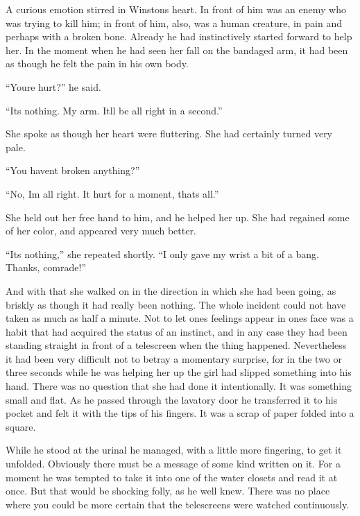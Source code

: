 A curious emotion stirred in Winston\textquotesingle s heart. In front
of him was an enemy who was trying to kill him; in front of him, also,
was a human creature, in pain and perhaps with a broken bone. Already he
had instinctively started forward to help her. In the moment when he had
seen her fall on the bandaged arm, it had been as though he felt the
pain in his own body.

``You\textquotesingle re hurt?'' he said.

``It\textquotesingle s nothing. My arm. It\textquotesingle ll be all
right in a second.''

She spoke as though her heart were fluttering. She had certainly turned
very pale.

``You haven\textquotesingle t broken anything?''

``No, I\textquotesingle m all right. It hurt for a moment,
that\textquotesingle s all.''

She held out her free hand to him, and he helped her up. She had
regained some of her color, and appeared very much better.

``It\textquotesingle s nothing,'' she repeated shortly. ``I only gave my
wrist a bit of a bang. Thanks, comrade!''

And with that she walked on in the direction in which she had been
going, as briskly as though it had really been nothing. The whole
incident could not have taken as much as half a minute. Not to let
one\textquotesingle s feelings appear in one\textquotesingle s face was
a habit that had acquired the status of an instinct, and in any case
they had been standing straight in front of a telescreen when the thing
happened. Nevertheless it had been very difficult not to betray a
momentary surprise, for in the two or three seconds while he was helping
her up the girl had slipped something into his hand. There was no
question that she had done it intentionally. It was something small and
flat. As he passed through the lavatory door he transferred it to his
pocket and felt it with the tips of his fingers. It was a scrap of paper
folded into a square.

While he stood at the urinal he managed, with a little more fingering,
to get it unfolded. Obviously there must be a message of some kind
written on it. For a moment he was tempted to take it into one of the
water closets and read it at once. But that would be shocking folly, as
he well knew. There was no place where you could be more certain that
the telescreens were watched continuously.

